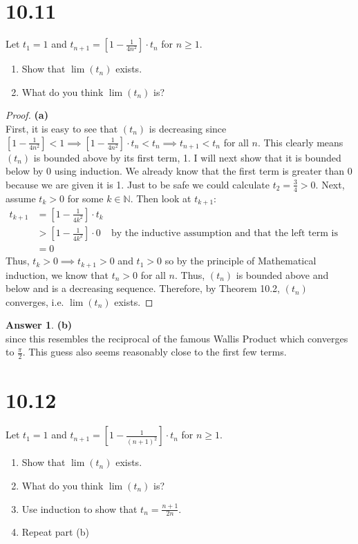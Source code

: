 \documentclass[10pt,a4paper]{article}
\theoremstyle{definition}
\newtheorem*{answer*}{Answer}
\begin{document}
\section*{10.11}
Let $t_1 = 1$ and $\displaystyle t_{n + 1} = \left[1 - \frac{1}{4n^2}\right] \cdot t_n$ for $n \geq 1$. 
\begin{enumerate}[label = (\alph*)]
\item Show that $\lim(t_n)$ exists.
\item What do you think $\lim(t_n)$ is?
\end{enumerate}

\begin{proof}{\textbf{(a)}}
\\First, it is easy to see that $(t_n)$ is decreasing since $\displaystyle \left[1 - \frac{1}{4n^2}\right] < 1 \implies \left[1 - \frac{1}{4n^2}\right]\cdot t_n < t_n \implies t_{n+1} < t_n$ for all $n$. This clearly means $(t_n)$ is bounded above by its first term, 1. I will next show that it is bounded below by 0 using induction. We already know that the first term is greater than 0 because we are given it is 1. Just to be safe we could calculate $t_2 = \frac{3}{4} > 0$. Next, assume $t_k > 0$ for some $k \in \mathbb{N}$. Then look at $t_{k+1}$:
\begin{align*}
t_{k + 1} &= \left[1 - \frac{1}{4k^2}\right] \cdot t_k\\
&> \left[1 - \frac{1}{4k^2}\right] \cdot 0 &\text{by the inductive assumption and that the left term is positve}\\
&= 0
\end{align*}
Thus, $t_k > 0 \implies t_{k+1} > 0$ and $t_1 > 0$ so by the principle of Mathematical induction, we know that $t_n > 0$ for all $n$. Thus, $(t_n)$ is bounded above and below and is a decreasing sequence. Therefore, by Theorem 10.2, $(t_n)$ converges, i.e. $\lim(t_n)$ exists. 
\end{proof}

\begin{answer*}{\textbf{(b)}}
\\ since this resembles the reciprocal of the famous Wallis Product which converges to $\displaystyle \frac{\pi}{2}$. This guess also seems reasonably close to the first few terms. 
\end{answer*}

\section*{10.12}
Let $t_1 = 1$ and $\displaystyle t_{n + 1} = \left[1 - \frac{1}{(n + 1)^2}\right]\cdot t_n$ for $n \geq 1$.
\begin{enumerate}[label = (\alph*)]
\item Show that $\lim(t_n)$ exists.
\item What do you think $\lim(t_n)$ is?
\item Use induction to show that $\displaystyle t_n = \frac{n + 1}{2n}$.
\item Repeat part (b)
\end{enumerate}
\end{document}
